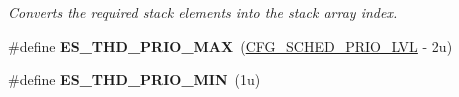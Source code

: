 \begin{DoxyCompactItemize}
\begin{DoxyCompactList}\small\item\em Converts the required stack elements into the stack array index. \end{DoxyCompactList}\item 
\hypertarget{group__kern__intf_gaea99f5a5153b96c419c384323a9e7bca}{\#define {\bfseries E\-S\-\_\-\-T\-H\-D\-\_\-\-P\-R\-I\-O\-\_\-\-M\-A\-X}~(\hyperlink{group__template__kern__cfg_ga56bd89fe76f7fe22f3d8805bc3c68892}{C\-F\-G\-\_\-\-S\-C\-H\-E\-D\-\_\-\-P\-R\-I\-O\-\_\-\-L\-V\-L} -\/ 2u)}\label{group__kern__intf_gaea99f5a5153b96c419c384323a9e7bca}

\item 
\hypertarget{group__kern__intf_gaec52780457f8ad9d4701b0d44a7ee0bc}{\#define {\bfseries E\-S\-\_\-\-T\-H\-D\-\_\-\-P\-R\-I\-O\-\_\-\-M\-I\-N}~(1u)}\label{group__kern__intf_gaec52780457f8ad9d4701b0d44a7ee0bc}

\end{DoxyCompactItemize}
